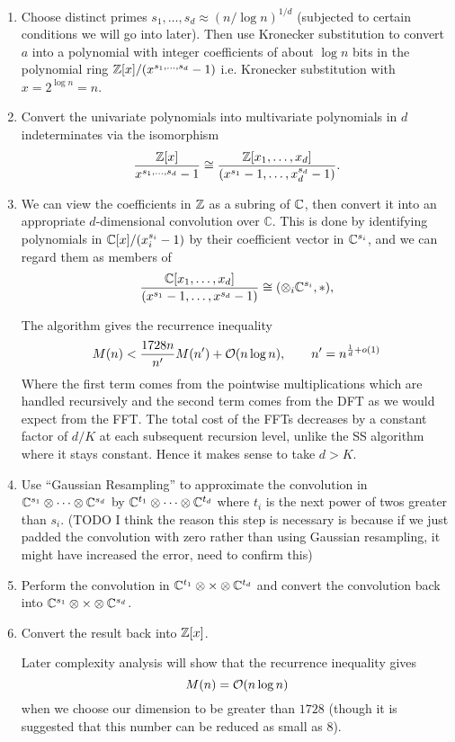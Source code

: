\begin{enumerate}
    \item  Choose distinct primes $s_1, \ldots, s_d \approx (n / \log n)^{1/d}$ (subjected to certain conditions we will go into later). Then use Kronecker substitution to convert $a$ into a polynomial with integer coefficients of about $\log n$ bits in the polynomial ring ${\mathbb Z}[x]/ (x^{s_1, \ldots, s_d} - 1)$ i.e. Kronecker substitution with $x = 2^{\log n} = n$.

    \item Convert the univariate polynomials into multivariate polynomials in $d$ indeterminates via the isomorphism
    \[
        \frac{{\mathbb Z}[x]}{x^{s_1, \ldots, s_d} - 1} \cong \frac{{\mathbb Z}[x_1, \ldots, x_d]}{(x^{s_1} - 1, \ldots, x_d^{s_d} - 1)}.
    \]
    \item We can view the coefficients in ${\mathbb Z}$ as a subring of ${\mathbb C}$, then convert it into an appropriate $d$-dimensional convolution over $\mathbb{C}$.
This is done by identifying polynomials in ${\mathbb C}[x]/(x_i^{s_i} - 1)$ by their coefficient vector in ${\mathbb C}^{s_i}$, and we can regard them as members of
    \[
        \frac{{\mathbb C}[x_1, \ldots, x_d]}{(x^{s_1} - 1, \ldots, x^{s_d} - 1)} \cong (\otimes_i {\mathbb C}^{s_i}, \ast),
    \]

    The algorithm gives the recurrence inequality
    \[
        M(n) < \frac{1728n}{n^\prime}M(n^\prime) + \mathcal O(n \log n), \qquad n^\prime = n^{\frac{1}{d} + o(1)}
    \]
    Where the first term comes from the pointwise multiplications which are handled recursively and the second term comes from the DFT as we would expect from the FFT. The total cost of the FFTs decreases by a constant factor of $d/K$ at each subsequent recursion level, unlike the SS algorithm where it stays constant. Hence it makes sense to take $d > K$.

\item Use ``Gaussian Resampling'' to approximate the convolution in ${\mathbb C}^{s_1} \otimes \cdots \otimes {\mathbb C}^{s_d}$ by ${\mathbb C}^{t_1} \otimes \cdots \otimes {\mathbb C}^{t_d}$ where $t_i$ is the next power of twos greater than $s_i$. (TODO I think the reason this step is necessary is because if we just padded the convolution with zero rather than using Gaussian resampling, it might have increased the error, need to confirm this)
    \item Perform the convolution in ${\mathbb C}^{t_1} \otimes \times \otimes {\mathbb C}^{t_d}$ and convert the convolution back into ${\mathbb C}^{s_1} \otimes \times \otimes {\mathbb C}^{s_d}$. 
    \item Convert the result back into ${\mathbb Z}[x]$.

    Later complexity analysis will show that the recurrence inequality gives
    \[
    M(n) = \mathcal O(n \log n)
    \]
    when we choose our dimension to be greater than $1728$ (though it is suggested that this number can be reduced as small as $8$).
\end{enumerate}

